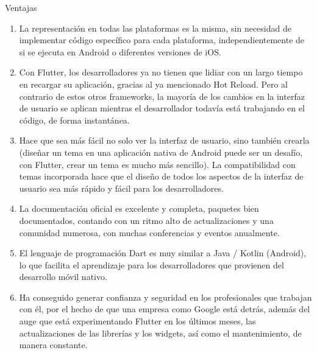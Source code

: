 Ventajas
\begin{enumerate}

\item	La representación en todas las plataformas es la misma, sin necesidad de implementar código específico para cada plataforma, independientemente de si se ejecuta en Android o diferentes versiones de iOS.
\item	Con Flutter, los desarrolladores ya no tienen que lidiar con un largo tiempo en recargar su aplicación, gracias al ya mencionado Hot Reload. Pero al contrario de estos otros frameworks, la mayoría de los cambios en la interfaz de usuario se aplican mientras el desarrollador todavía está trabajando en el código, de forma instantánea.
\item	Hace que sea más fácil no solo ver la interfaz de usuario, sino también crearla (diseñar un tema en una aplicación nativa de Android puede ser un desafío, con Flutter, crear un tema es mucho más sencillo). La compatibilidad con temas incorporada hace que el diseño de todos los aspectos de la interfaz de usuario sea más rápido y fácil para los desarrolladores.
\item	La documentación oficial es excelente y completa, paquetes bien documentados, contando con un ritmo alto de actualizaciones y una comunidad numerosa, con muchas conferencias y eventos anualmente.
\item	El lenguaje de programación Dart es muy similar a Java / Kotlin (Android), lo que facilita el aprendizaje para los desarrolladores que provienen del desarrollo móvil nativo.
\item	Ha conseguido generar confianza y seguridad en los profesionales que trabajan con él, por el hecho de que una empresa como Google está detrás, además del auge que está experimentando Flutter en los últimos meses, las actualizaciones de las librerías y los widgets, así como el mantenimiento, de manera constante.

\end{enumerate}

